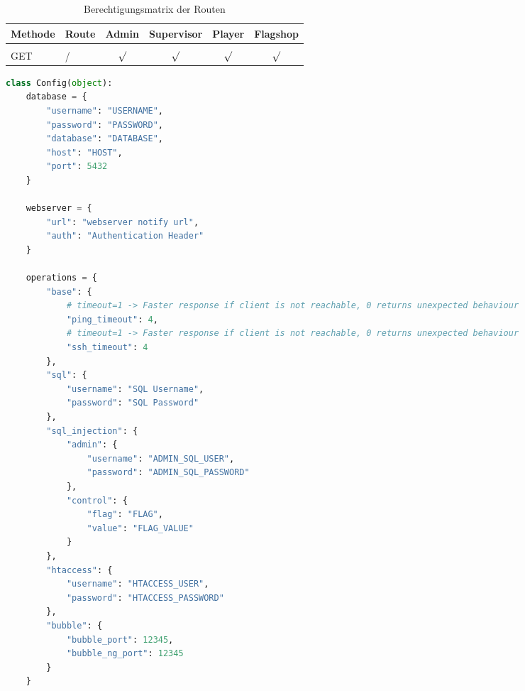 \begin{table}
	\centering
	\begin{tabular}{l l c c c c}
		Methode & Route	& Admin & Supervisor & Player  & Flagshop \\ [0.5ex]
		\hline &&&&&\\
		GET & /	&  $\surd$ &  $\surd$  &  $\surd$ &  $\surd$ \\
	\end{tabular}
	\caption{Berechtigungsmatrix der Routen}
	\label{table:gis-permission}
\end{table}


\begin{lstlisting}[frame=single, language=python]
	class Config(object):
	database = {
		"username": "USERNAME",
		"password": "PASSWORD",
		"database": "DATABASE",
		"host": "HOST",
		"port": 5432
	}
	
	webserver = {
		"url": "webserver notify url",
		"auth": "Authentication Header"
	}
	
	operations = {
		"base": {
			# timeout=1 -> Faster response if client is not reachable, 0 returns unexpected behaviour
			"ping_timeout": 4,
			# timeout=1 -> Faster response if client is not reachable, 0 returns unexpected behaviour
			"ssh_timeout": 4
		},
		"sql": {
			"username": "SQL Username",
			"password": "SQL Password"
		},
		"sql_injection": {
			"admin": {
				"username": "ADMIN_SQL_USER",
				"password": "ADMIN_SQL_PASSWORD"
			},
			"control": {
				"flag": "FLAG",
				"value": "FLAG_VALUE"
			}
		},
		"htaccess": {
			"username": "HTACCESS_USER",
			"password": "HTACCESS_PASSWORD"
		},
		"bubble": {
			"bubble_port": 12345,
			"bubble_ng_port": 12345
		}
	}
\end{lstlisting}

